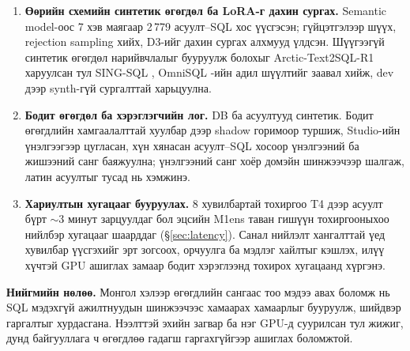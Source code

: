 \begin{enumerate}
  \item \textbf{Өөрийн схемийн синтетик өгөгдөл ба LoRA-г дахин сургах.} Semantic model-оос 7 хэв маягаар 2\,779
        асуулт--SQL хос үүсгэсэн; гүйцэтгэлээр шүүх, rejection sampling хийх, D3-ийг дахин сургах алхмууд үлдсэн.
        Шүүгээгүй синтетик өгөгдөл нарийвчлалыг бууруулж болохыг Arctic-Text2SQL-R1 \cite{yao_2025_arctic_text2sql_r1}
        харуулсан тул SING-SQL \cite{caferoglu_2025_sing_sql}, OmniSQL \cite{li_2025_omnisql}-ийн адил шүүлтийг заавал
        хийж, dev дээр synth-гүй сургалттай харьцуулна.
  \item \textbf{Бодит өгөгдөл ба хэрэглэгчийн лог.} DB ба асуултууд синтетик. Бодит өгөгдлийн хамгаалалттай хуулбар
        дээр shadow горимоор туршиж, Studio-ийн үнэлгээгээр цугласан, хүн хянасан асуулт--SQL хосоор үнэлгээний ба
        жишээний санг баяжуулна; үнэлгээний санг хоёр домэйн шинжээчээр шалгаж, латин асуултыг тусад нь хэмжинэ.
  \item \textbf{Хариултын хугацааг бууруулах.} 8 хувилбартай тохиргоо T4 дээр асуулт бүрт $\sim$3 минут зарцуулдаг бол
        эцсийн M1ens таван гишүүн тохиргооныхоо нийлбэр хугацааг шаарддаг (§\ref{sec:latency}). Санал нийлэлт хангалттай үед хувилбар үүсгэхийг эрт зогсоох, орчуулга ба мэдлэг хайлтыг
        кэшлэх, илүү хүчтэй GPU ашиглах замаар бодит хэрэглээнд тохирох хугацаанд хүргэнэ.
\end{enumerate}

\textbf{Нийгмийн нөлөө.} Монгол хэлээр өгөгдлийн сангаас тоо мэдээ авах боломж нь SQL мэдэхгүй ажилтнуудын шинжээчээс
хамаарах хамаарлыг бууруулж, шийдвэр гаргалтыг хурдасгана. Нээлттэй эхийн загвар ба нэг GPU-д суурилсан тул жижиг, дунд
байгууллага ч өгөгдлөө гадагш гаргахгүйгээр ашиглах боломжтой.

